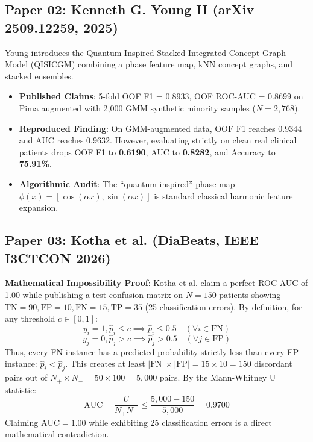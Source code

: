 \documentclass[10pt,journal,compsoc]{IEEEtran}
\begin{document}
\subsection{Paper 02: Kenneth G. Young II (arXiv 2509.12259, 2025)}
Young introduces the Quantum-Inspired Stacked Integrated Concept Graph Model (QISICGM) combining a phase feature map, kNN concept graphs, and stacked ensembles.
\begin{itemize}
    \item \textbf{Published Claims}: 5-fold OOF F1 = 0.8933, OOF ROC-AUC = 0.8699 on Pima augmented with 2,000 GMM synthetic minority samples ($N=2,768$).
    \item \textbf{Reproduced Finding}: On GMM-augmented data, OOF F1 reaches 0.9344 and AUC reaches 0.9632. However, evaluating strictly on clean real clinical patients drops OOF F1 to \textbf{0.6190}, AUC to \textbf{0.8282}, and Accuracy to \textbf{75.91\%}.
    \item \textbf{Algorithmic Audit}: The ``quantum-inspired'' phase map $\phi(x) = [\cos(\alpha x), \sin(\alpha x)]$ is standard classical harmonic feature expansion.
\end{itemize}

\subsection{Paper 03: Kotha et al. (DiaBeats, IEEE I3CTCON 2026)}
\textbf{Mathematical Impossibility Proof}: Kotha et al. claim a perfect ROC-AUC of 1.00 while publishing a test confusion matrix on $N=150$ patients showing $\text{TN}=90, \text{FP}=10, \text{FN}=15, \text{TP}=35$ (25 classification errors). 
By definition, for any threshold $c \in [0, 1]$:
\begin{equation}
y_i = 1, \hat{p}_i \le c \implies \hat{p}_i \le 0.5 \quad (\forall i \in \text{FN})
\end{equation}
\begin{equation}
y_j = 0, \hat{p}_j > c \implies \hat{p}_j > 0.5 \quad (\forall j \in \text{FP})
\end{equation}
Thus, every FN instance has a predicted probability strictly less than every FP instance: $\hat{p}_i < \hat{p}_j$. This creates at least $|\text{FN}| \times |\text{FP}| = 15 \times 10 = 150$ discordant pairs out of $N_+ \times N_- = 50 \times 100 = 5,000$ pairs. By the Mann-Whitney U statistic:
\begin{equation}
\text{AUC} = \frac{U}{N_+ N_-} \le \frac{5,000 - 150}{5,000} = 0.9700
\end{equation}
Claiming $\text{AUC} = 1.00$ while exhibiting 25 classification errors is a direct mathematical contradiction.
\end{document}

